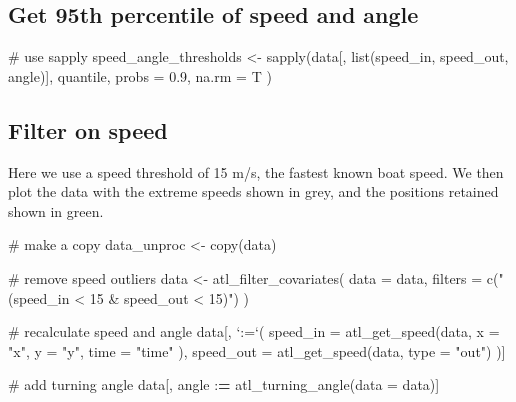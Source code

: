 \documentclass[]{scrreprt}
\newenvironment{Shaded}{}{}
\newcommand{\CommentTok}[1]{\textcolor[rgb]{0.00,0.50,0.00}{#1}}
\newcommand{\DataTypeTok}[1]{#1}
\newcommand{\ErrorTok}[1]{\textcolor[rgb]{1.00,0.00,0.00}{\textbf{#1}}}
\newcommand{\FloatTok}[1]{#1}
\newcommand{\KeywordTok}[1]{\textcolor[rgb]{0.00,0.00,1.00}{#1}}
\newcommand{\NormalTok}[1]{#1}
\newcommand{\OperatorTok}[1]{#1}
\newcommand{\StringTok}[1]{\textcolor[rgb]{0.00,0.50,0.50}{#1}}
\begin{document}
\hypertarget{get-95th-percentile-of-speed-and-angle}{%
\subsection{Get 95th percentile of speed and angle}\label{get-95th-percentile-of-speed-and-angle}}

\begin{Shaded}
\begin{Highlighting}[]
\CommentTok{# use sapply}
\NormalTok{speed_angle_thresholds <-}
\StringTok{  }\KeywordTok{sapply}\NormalTok{(data[, }\KeywordTok{list}\NormalTok{(speed_in, speed_out, angle)],}
\NormalTok{    quantile,}
    \DataTypeTok{probs =} \FloatTok{0.9}\NormalTok{, }\DataTypeTok{na.rm =}\NormalTok{ T}
\NormalTok{  )}
\end{Highlighting}
\end{Shaded}

\hypertarget{filter-on-speed}{%
\subsection{Filter on speed}\label{filter-on-speed}}

Here we use a speed threshold of 15 m/s, the fastest known boat speed.
We then plot the data with the extreme speeds shown in grey, and the positions retained shown in green.

\begin{Shaded}
\begin{Highlighting}[]
\CommentTok{# make a copy}
\NormalTok{data_unproc <-}\StringTok{ }\KeywordTok{copy}\NormalTok{(data)}

\CommentTok{# remove speed outliers}
\NormalTok{data <-}\StringTok{ }\KeywordTok{atl_filter_covariates}\NormalTok{(}
  \DataTypeTok{data =}\NormalTok{ data,}
  \DataTypeTok{filters =} \KeywordTok{c}\NormalTok{(}\StringTok{"(speed_in < 15 & speed_out < 15)"}\NormalTok{)}
\NormalTok{)}

\CommentTok{# recalculate speed and angle}
\NormalTok{data[, }\StringTok{`}\DataTypeTok{:=}\StringTok{`}\NormalTok{(}
  \DataTypeTok{speed_in =} \KeywordTok{atl_get_speed}\NormalTok{(data,}
    \DataTypeTok{x =} \StringTok{"x"}\NormalTok{,}
    \DataTypeTok{y =} \StringTok{"y"}\NormalTok{,}
    \DataTypeTok{time =} \StringTok{"time"}
\NormalTok{  ),}
  \DataTypeTok{speed_out =} \KeywordTok{atl_get_speed}\NormalTok{(data, }\DataTypeTok{type =} \StringTok{"out"}\NormalTok{)}
\NormalTok{)]}

\CommentTok{# add turning angle}
\NormalTok{data[, angle }\OperatorTok{:}\ErrorTok{=}\StringTok{ }\KeywordTok{atl_turning_angle}\NormalTok{(}\DataTypeTok{data =}\NormalTok{ data)]}
\end{Highlighting}
\end{Shaded}
\end{document}
